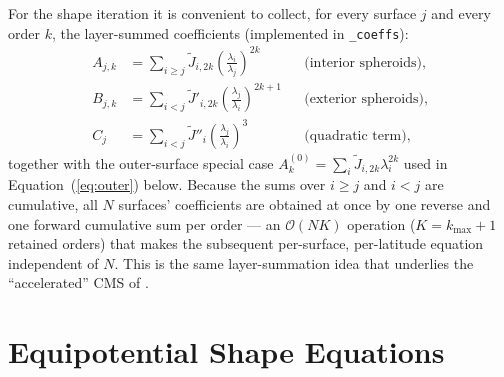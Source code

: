 \documentclass{aastex631}
\newcommand{\Jt}{\tilde{J}}
\newcommand{\Jtp}{\tilde{J}'}
\newcommand{\Jtpp}{\tilde{J}''}
\begin{document}
For the shape iteration it is convenient to collect, for every surface
$j$ and every order $k$, the layer-summed coefficients (implemented in
\texttt{\_coeffs}):
\begin{align}
A_{j,k} &= \sum_{i \ge j} \Jt_{i,2k}
  \left(\frac{\lambda_i}{\lambda_j}\right)^{2k}
  &&\text{(interior spheroids)},
\label{eq:A}\\
B_{j,k} &= \sum_{i < j} \Jtp_{i,2k}
  \left(\frac{\lambda_j}{\lambda_i}\right)^{2k+1}
  &&\text{(exterior spheroids)},
\label{eq:B}\\
C_{j} &= \sum_{i < j} \Jtpp_{i}
  \left(\frac{\lambda_j}{\lambda_i}\right)^{3}
  &&\text{(quadratic term)},
\label{eq:C}
\end{align}
together with the outer-surface special case
$A^{(0)}_k = \sum_i \Jt_{i,2k}\lambda_i^{2k}$ used in
Equation~(\ref{eq:outer}) below.  Because the sums over $i \ge j$ and
$i < j$ are cumulative, all $N$ surfaces' coefficients are obtained at
once by one reverse and one forward cumulative sum per order --- an
$\mathcal{O}(NK)$ operation ($K = k_{\max}+1$ retained orders) that makes
the subsequent per-surface, per-latitude equation independent of $N$.
This is the same layer-summation idea that underlies the ``accelerated''
CMS of \citet{Militzer2019}.

\section{Equipotential Shape Equations}\label{sec:equipotential}
\end{document}
